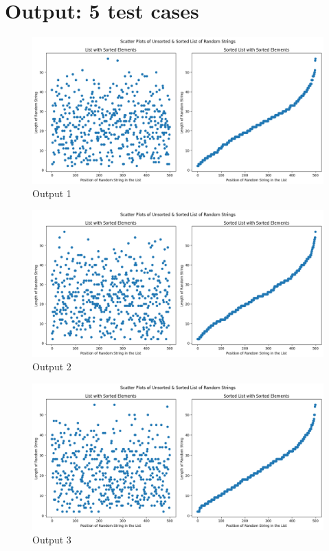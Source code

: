 \documentclass[UTF8, letter]{article}
\begin{document}
\pagebreak
\section*{Output: 5 test cases}

\begin{figure}[hbt!]
	\centering
	\includegraphics[width=\linewidth]{output_1.png}
	\caption{Output 1}
	\label{fig:Output1}
\end{figure}

\vspace{5mm}
\begin{figure}[hbt!]
	\centering
	\includegraphics[width=\linewidth]{output_2.png}
	\caption{Output 2}
	\label{fig:Output2}
\end{figure}

\vspace{5mm}
\begin{figure}[hbt!]
	\centering
	\includegraphics[width=\linewidth]{output_3.png}
	\caption{Output 3}
	\label{fig:Output3}
\end{figure}
\end{document}
